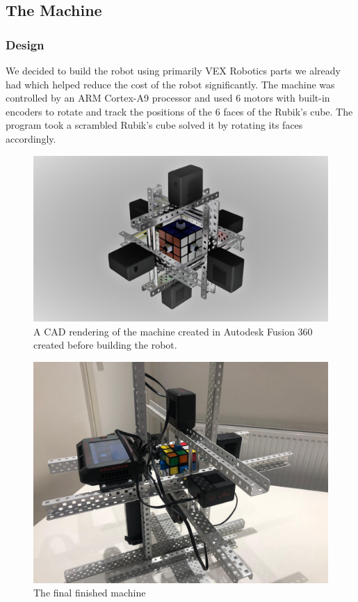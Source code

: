 \documentclass[8pt]{article}
\begin{document}
\subsection{The Machine}

\subsubsection{Design}

We decided to build the robot using primarily VEX Robotics parts we already had which helped
reduce the cost of the robot significantly. The machine was controlled by an ARM Cortex-A9 processor and
used 6 motors with built-in encoders to rotate and track the positions of the 6 faces of the 
Rubik's cube. The program took a scrambled Rubik's cube solved it by rotating its faces accordingly. 

\begin{minipage}{0.45\textwidth}
\begin{figure}[H]
\centering
\includegraphics[scale=0.05]{main cad.jpg}
\caption{A CAD rendering of the machine created in Autodesk Fusion 360 created
before building the robot.}
\end{figure}
\end{minipage}%
\hfill
\begin{minipage}{0.45\textwidth}
\begin{figure}[H]
\centering
\includegraphics[scale=0.11]{final machine.jpg}
\caption{The final finished machine}
\end{figure}
\end{minipage}
\end{document}
